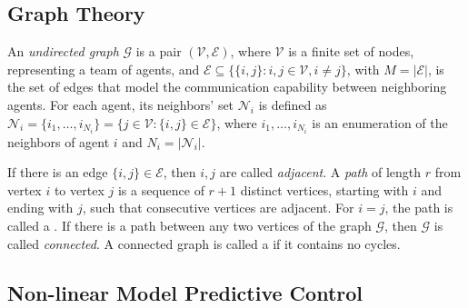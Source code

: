 \subsection{Graph Theory}
An \textit{undirected graph} $\mathcal{G}$ is a pair
$(\mathcal{V}, \mathcal{E})$, where $\mathcal{V}$ is a finite set of nodes,
representing a team of agents, and
$\mathcal{E} \subseteq \big\{ \{i,j\} : i,j \in \mathcal{V}, i \neq j \big\}$,
with $M = |\mathcal{E}|$, is the set of edges that model the communication
capability between neighboring agents. For each agent, its neighbors' set
$\mathcal{N}_i$ is defined as
$\mathcal{N}_i = \{i_1, \ldots, i_{N_i}\} = \big\{ j \in \mathcal{V} : \{i,j\} \in \mathcal{E}\big\}$,
where $i_1, \ldots, i_{N_i}$ is an enumeration of the neighbors of agent $i$
and $N_i = |\mathcal N_i|$.

If there is an edge $\{i, j\} \in \mathcal{E}$, then $i, j$ are called
\textit{adjacent}. A \textit{path} of length $r$ from vertex $i$ to vertex
$j$ is a sequence of $r+1$ distinct vertices, starting with $i$ and ending
with $j$, such that consecutive vertices are adjacent. For $i = j$, the path
is called a . If there is a path between any two vertices of the
graph $\mathcal{G}$, then $\mathcal{G}$ is called \textit{connected}.
A connected graph is called a  if it contains no cycles.



\subsection{Non-linear Model Predictive Control}
